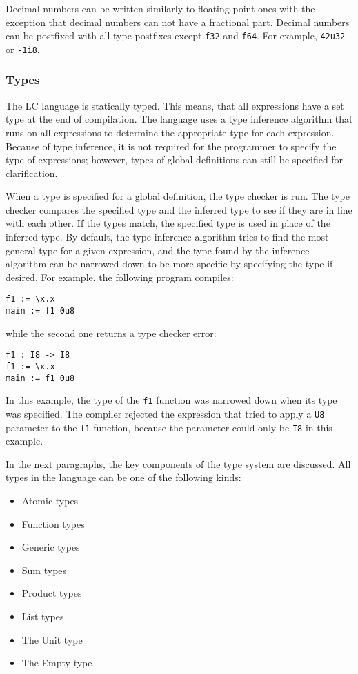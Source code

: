 \documentclass[12pt]{article}
\begin{document}
Decimal numbers can be written similarly to floating point ones with the
exception that decimal numbers can not have a fractional part. Decimal numbers
can be postfixed with all type postfixes except \verb$f32$ and \verb$f64$. For
example, \verb$42u32$ or \verb$-1i8$.

\subsubsection{Types}

The LC language is statically typed. This means, that all expressions have a
set type at the end of compilation. The language uses a type inference algorithm
that runs on all expressions to determine the appropriate type for each
expression. Because of type inference, it is not required for the programmer to
specify the type of expressions; however, types of global definitions can still 
be specified for clarification.

When a type is specified for a global definition, the type checker is run. The
type checker compares the specified type and the inferred type to see if they
are in line with each other. If the types match, the specified type is used in
place of the inferred type. By default, the type inference algorithm tries to
find the most general type for a given expression, and the type found by the
inference algorithm can be narrowed down to be more specific by specifying the
type if desired. For example, the following program compiles:
\begin{lstlisting}
f1 := \x.x
main := f1 0u8
\end{lstlisting}
while the second one returns a type checker error:
\begin{lstlisting}
f1 : I8 -> I8
f1 := \x.x
main := f1 0u8
\end{lstlisting}
In this example, the type of the \verb$f1$ function was narrowed down when its
type was specified. The compiler rejected the expression that tried to apply a
\verb$U8$ parameter to the \verb$f1$ function, because the parameter could only
be \verb$I8$ in this example.

In the next paragraphs, the key components of the type system are discussed. All
types in the language can be one of the following kinds:
\begin{itemize}
    \item Atomic types
    \item Function types
    \item Generic types
    \item Sum types
    \item Product types
    \item List types
    \item The Unit type
    \item The Empty type
\end{itemize}
\end{document}
